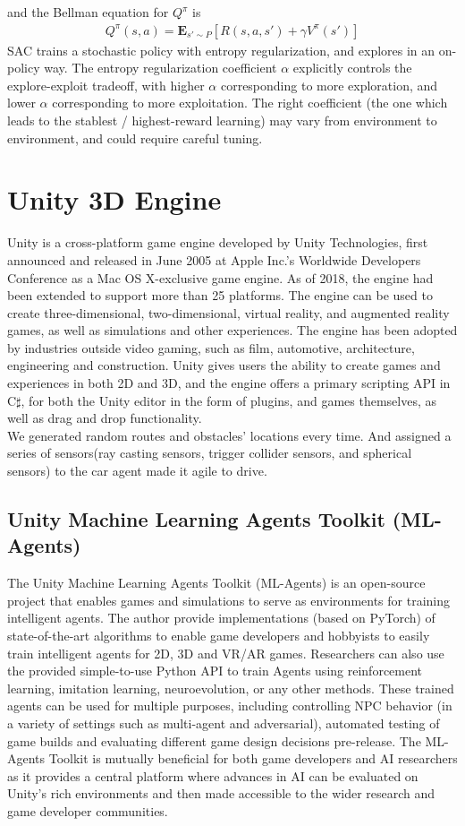 and the Bellman equation for $Q^{\pi}$ is
\begin{align*}
      Q^{\pi}(s,a)=\mathbf{E}_{s' \sim P}[R(s,a,s')+\gamma V^{\pi}(s')]
\end{align*}
SAC trains a stochastic policy with entropy regularization, and explores in an on-policy way. The entropy regularization coefficient $\alpha$ explicitly controls the explore-exploit tradeoff, with higher $\alpha$ corresponding to more exploration, and lower $\alpha$ corresponding to more exploitation. The right coefficient (the one which leads to the stablest / highest-reward learning) may vary from environment to environment, and could require careful tuning.
\section{Unity 3D Engine}
Unity is a cross-platform game engine developed by Unity Technologies, first announced and released in June 2005 at Apple Inc.'s Worldwide Developers Conference as a Mac OS X-exclusive game engine. As of 2018, the engine had been extended to support more than 25 platforms. The engine can be used to create three-dimensional, two-dimensional, virtual reality, and augmented reality games, as well as simulations and other experiences. The engine has been adopted by industries outside video gaming, such as film, automotive, architecture, engineering and construction. Unity gives users the ability to create games and experiences in both 2D and 3D, and the engine offers a primary scripting API in C$\sharp$, for both the Unity editor in the form of plugins, and games themselves, as well as drag and drop functionality. \\ 
We generated random routes and obstacles' locations every time. And assigned a series of sensors(ray casting sensors, trigger collider sensors, and spherical sensors) to the car agent made it agile to drive.
\subsection{Unity Machine Learning Agents Toolkit (ML-Agents)}
The Unity Machine Learning Agents Toolkit (ML-Agents) is an open-source project that enables games and simulations to serve as environments for training intelligent agents. The author provide implementations (based on PyTorch) of state-of-the-art algorithms to enable game developers and hobbyists to easily train intelligent agents for 2D, 3D and VR/AR games. Researchers can also use the provided simple-to-use Python API to train Agents using reinforcement learning, imitation learning, neuroevolution, or any other methods. These trained agents can be used for multiple purposes, including controlling NPC behavior (in a variety of settings such as multi-agent and adversarial), automated testing of game builds and evaluating different game design decisions pre-release. The ML-Agents Toolkit is mutually beneficial for both game developers and AI researchers as it provides a central platform where advances in AI can be evaluated on Unity’s rich environments and then made accessible to the wider research and game developer communities.